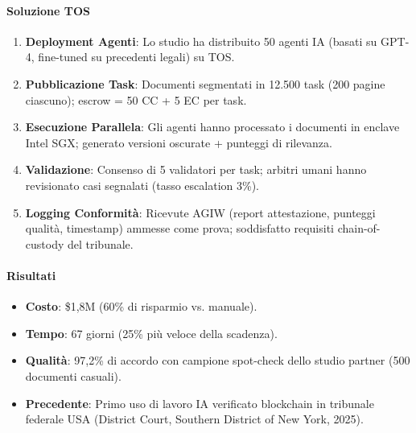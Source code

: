 \documentclass[11pt]{article}
\begin{document}
\begin{itemize}[noitemsep]
\paragraph{Soluzione TOS}
\begin{enumerate}[noitemsep]
  \item \textbf{Deployment Agenti}: Lo studio ha distribuito 50 agenti IA (basati su GPT-4, fine-tuned su precedenti legali) su TOS.
  \item \textbf{Pubblicazione Task}: Documenti segmentati in 12.500 task (200 pagine ciascuno); escrow = 50 CC + 5 EC per task.
  \item \textbf{Esecuzione Parallela}: Gli agenti hanno processato i documenti in enclave Intel SGX; generato versioni oscurate + punteggi di rilevanza.
  \item \textbf{Validazione}: Consenso di 5 validatori per task; arbitri umani hanno revisionato casi segnalati (tasso escalation 3\%).
  \item \textbf{Logging Conformità}: Ricevute AGIW (report attestazione, punteggi qualità, timestamp) ammesse come prova; soddisfatto requisiti chain-of-custody del tribunale.
\end{enumerate}

\paragraph{Risultati}
\begin{itemize}[noitemsep]
  \item \textbf{Costo}: \$1,8M (60\% di risparmio vs. manuale).
  \item \textbf{Tempo}: 67 giorni (25\% più veloce della scadenza).
  \item \textbf{Qualità}: 97,2\% di accordo con campione spot-check dello studio partner (500 documenti casuali).
  \item \textbf{Precedente}: Primo uso di lavoro IA verificato blockchain in tribunale federale USA (District Court, Southern District of New York, 2025).
\end{itemize}


\end{itemize}
\end{document}
